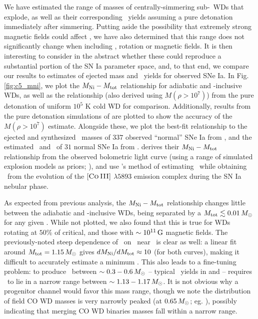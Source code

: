 We have estimated the range of masses of centrally-simmering sub-\Mch\ WDs that explode, as well as their corresponding \MNi\ yields assuming a pure detonation immediately after simmering.  Putting aside the possibility that extremely strong magnetic fields could affect \vconv, we have also determined that this range does not significantly change when including \dnabconv, rotation or magnetic fields.  It is then interesting to consider in the abstract whether these could reproduce a substantial portion of the SN Ia parameter space, and, to that end, we compare our results to estimates of ejected mass and \Ni\ yields for observed SNe Ia.  In Fig. \ref{fig:c5_mni}, we plot the $\MNi-\Mtot$ relationship for adiabatic and \dnabconv-inclusive WDs, as well as the relationship (also derived using $M(\rho>10^7)$) from the pure detonation of uniform $10^5$ K cold WD for comparison.  Additionally, results from the pure detonation simulations of \cite{sim+10} are plotted to show the accuracy of the $M(\rho>10^7)$ estimate.  Alongside these, we plot the best-fit relationship to the ejected and synthesized \Ni\ masses of $337$ observed ``normal'' \citep{bran+06} SNe Ia from \cite{scalzrs14}, and the estimated \Mtot\ and \MNi\ of $31$ normal SNe Ia from \cite{chil+15}.  \cite{scalzrs14} derives their $\MNi-\Mtot$ relationship from the observed bolometric light curve (using a range of simulated explosion models as priors; \citealt{scalz+14}), and \cite{chil+15} use \cite{scalzrs14}'s method of estimating \Mtot\ while obtaining \MNi\ from the evolution of the $[\textsc{Co\,III}]$ $\lambda5893$ emission complex during the SN Ia nebular phase.


As expected from previous analysis, the $\MNi-\Mtot$ relationship changes little between the adiabatic and \dnabconv-inclusive WDs, being separated by a $\Mtot\lesssim0.01\,\Msun$ for any given \MNi.  While not plotted, we also found that this is true for WDs rotating at $50$\% of critical, and those with $\sim10^{11}\,\mathrm{G}$ magnetic fields.  The previously-noted steep dependence of \MNi\ on \Mtot\ near \Mcrit\ is clear as well: a linear fit around $\Mtot = 1.15\,\Msun$ gives $d\MNi/d\Mtot \approx 10$ (for both curves), making it difficult to accurately estimate a minimum \MNi.  This also leads to a fine-tuning problem: to produce \MNi\ between $\sim0.3-0.6\,\Msun$ -- typical \MNi\ yields in \cite{scalzrs14} and \cite{chil+15} -- requires \Mtot\ to lie in a narrow range between $\sim 1.13 - 1.17\,\Msun$.  It is not obvious why a progenitor channel would favor this mass range, though we note the distribution of field CO WD masses is very narrowly peaked (at $0.65\,\Msun$; eg. \citealt{tremb09, klei+13}), possibly indicating that merging CO WD binaries masses fall within a narrow range.

